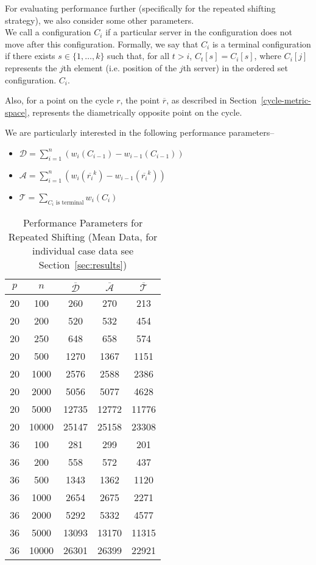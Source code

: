 For evaluating performance further (specifically for the repeated shifting strategy), we also consider some other parameters. \\

We call a configuration $C_i$  if a particular server in the configuration does not move after this configuration. Formally, we say that $C_i$ is a terminal configuration if there exists $s\in\{1,\hdots,k\}$ such that, for all $t>i$, $C_t[s] = C_i[s]$, where $C_i[j]$ represents the $j$th element (i.e. position of the $j$th server) in the ordered set configuration. $C_i$.

Also, for a point on the cycle $r$, the point $\overline{r}$, as described in Section~\ref{cycle-metric-space}, represents the diametrically opposite point on the cycle.

We are particularly interested in the following performance parameters--
\begin{itemize}
\item
$\mathcal{D} = \sum_{i=1}^{n} (w_i(C_{i-1}) - w_{i-1}(C_{i-1}))$
\item
$\mathcal{A} = \sum_{i=1}^{n} (w_i(\overline{r_i}^k) - w_{i-1}(\overline{r_i}^k))$
\item
$\mathcal{T} = \sum_{C_i\text{ is terminal}} w_i(C_i)$
\end{itemize}

\begin{table}[!ht]
\begin{center}
\begin{tabular}{|c|c|c|c|c|}
\hline
$p$ & $n$ & $\overline{\mathcal{D}}$ & $\overline{\mathcal{A}}$ & $\overline{\mathcal{T}}$ \\
\hline
20 & 100 & 260 & 270 & 213  \\
20 & 200 & 520 & 532 & 454  \\
20 & 250 & 648 & 658 & 574  \\
20 & 500 & 1270 & 1367 & 1151  \\
20 & 1000 & 2576 & 2588 & 2386  \\
20 & 2000 & 5056 & 5077 & 4628  \\
20 & 5000 & 12735 & 12772 & 11776  \\
20 & 10000 & 25147 & 25158 & 23308  \\
36 & 100 & 281 & 299 & 201  \\
36 & 200 & 558 & 572 & 437  \\
36 & 500 & 1343 & 1362 & 1120  \\
36 & 1000 & 2654 & 2675 & 2271  \\
36 & 2000 & 5292 & 5332 & 4577  \\
36 & 5000 & 13093 & 13170 & 11315  \\
36 & 10000 & 26301 & 26399 & 22921  \\
\hline
\end{tabular}
\caption{Performance Parameters for Repeated Shifting (Mean Data, for individual case data see Section~\ref{sec:results})}
\label{tab:avg-stats-repeated-shift}
\end{center}
\end{table}

